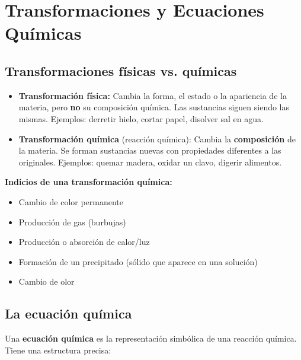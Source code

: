 \documentclass[12pt, a4paper]{article}
\begin{document}
\newpage

\section{Transformaciones y Ecuaciones Químicas}

\subsection{Transformaciones físicas vs. químicas}

\begin{cuadroteoria}
\begin{itemize}[leftmargin=*]
  \item \textbf{Transformación física:} Cambia la forma, el estado o la apariencia de la materia, pero \textbf{no} su composición química. Las sustancias siguen siendo las mismas. Ejemplos: derretir hielo, cortar papel, disolver sal en agua.

  \item \textbf{Transformación química} (reacción química): Cambia la \textbf{composición} de la materia. Se forman sustancias nuevas con propiedades diferentes a las originales. Ejemplos: quemar madera, oxidar un clavo, digerir alimentos.
\end{itemize}
\end{cuadroteoria}

\begin{cuadrosolucion}
\textbf{Indicios de una transformación química:}
\begin{itemize}[leftmargin=*]
  \item Cambio de color permanente
  \item Producción de gas (burbujas)
  \item Producción o absorción de calor/luz
  \item Formación de un precipitado (sólido que aparece en una solución)
  \item Cambio de olor
\end{itemize}
\end{cuadrosolucion}

\subsection{La ecuación química}

Una \textbf{ecuación química} es la representación simbólica de una reacción química. Tiene una estructura precisa:
\end{document}
